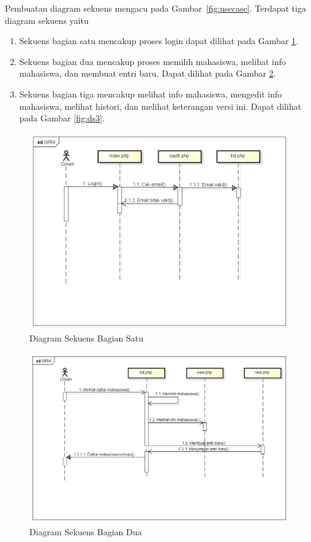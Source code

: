 Pembuatan diagram sekuens mengacu pada Gambar~\ref{fig:usecase}. Terdapat
tiga diagram sekuens yaitu 
\begin{enumerate}[(1)]
  \item Sekuens bagian satu mencakup proses login dapat dilihat pada Gambar
  \ref{fig:ds1}.
  \item Sekuens bagian dua mencakup proses memilih mahasiswa, melihat
  info mahasiswa, dan membuat entri baru. Dapat dilihat pada Gambar \ref{fig:ds2}.
  \item Sekuens bagian tiga mencakup melihat info mahasiswa, mengedit info
  mahasiswa, melihat histori, dan melihat keterangan versi ini.
  Dapat dilihat pada Gambar \ref{fig:ds3}.
\end{enumerate}

\begin{figure}[H]
\centering
\includegraphics[scale=0.5]{Gambar/sekuenslogin.png}
\caption[Diagram Sekuens Bagian Satu]{Diagram Sekuens Bagian Satu} 
\label{fig:ds1}
\end{figure}

\begin{figure}[H]
\centering
\includegraphics[scale=0.5]{Gambar/sekuenslist.png}
\caption[Diagram Sekuens Bagian Dua]{Diagram Sekuens Bagian Dua} 
\label{fig:ds2}
\end{figure}

